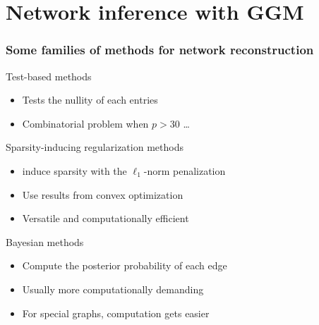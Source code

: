 \section{Network inference with GGM}

\begin{frame}
  \frametitle{Some families of methods for network reconstruction}

  \begin{block}{Test-based methods}
    \begin{itemize}
    \item Tests the nullity of each entries 
    \item Combinatorial problem when $p>30$ \dots
    \end{itemize}    
  \end{block}
  
  \vfill

  \begin{block}{\alert{Sparsity-inducing regularization methods}}
    \begin{itemize}
    \item induce sparsity with the $\ell_1$-norm penalization
    \item Use results from convex optimization
    \item Versatile and computationally efficient
    \end{itemize}
  \end{block}

  \vfill

  \begin{block}{Bayesian methods}
    \begin{itemize}
    \item Compute the posterior probability of each edge
    \item Usually more computationally demanding
    \item For special graphs, computation gets easier
    \end{itemize}
  \end{block}
  
\end{frame}


